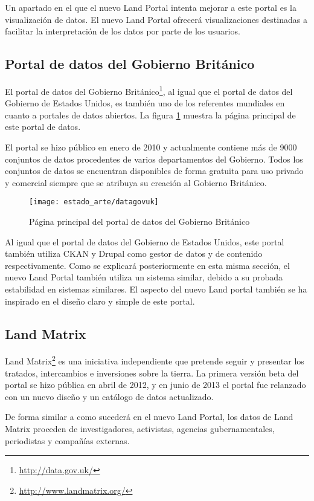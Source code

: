 {Un apartado en el que el nuevo Land Portal intenta mejorar a este portal es la visualización de datos. El nuevo Land Portal ofrecerá visualizaciones destinadas a facilitar la interpretación de los datos por parte de los usuarios.

\subsection{Portal de datos del Gobierno Británico}
El portal de datos del Gobierno Británico\footnote{\url{http://data.gov.uk/}}, al igual que el portal de datos del Gobierno de Estados Unidos, es también uno de los referentes mundiales en cuanto a portales de datos abiertos.  La figura \ref{fig:estado_arte_datagovuk} muestra la página principal de este portal de datos.

El portal se hizo público en enero de 2010 y actualmente contiene más de 9000 conjuntos de datos procedentes de varios departamentos del Gobierno.  Todos los conjuntos de datos se encuentran disponibles de forma gratuita para uso privado y comercial siempre que se atribuya su creación al Gobierno Británico.
\begin{figure}[h]
\centering
\texttt{[image: estado\_arte/datagovuk]}
\caption{Página principal del portal de datos del Gobierno Británico}
\label{fig:estado_arte_datagovuk}
\end{figure}

Al igual que el portal de datos del Gobierno de Estados Unidos, este portal también utiliza CKAN y Drupal como gestor de datos y de contenido respectivamente.  Como se explicará posteriormente en esta misma sección, el nuevo Land Portal también utiliza un sistema similar, debido a su probada estabilidad en sistemas similares.  El aspecto del nuevo Land portal también se ha inspirado en el diseño claro y simple de este portal.


\subsection{Land Matrix}
	Land Matrix\footnote{\url{http://www.landmatrix.org/}} es una iniciativa independiente que pretende seguir y presentar los tratados, intercambios e inversiones sobre la tierra.  La primera versión beta del portal se hizo pública en abril de 2012, y en junio de 2013 el portal fue relanzado con un nuevo diseño y un catálogo de datos actualizado.
	
	De forma similar a como sucederá en el nuevo Land Portal, los datos de Land Matrix proceden de investigadores, activistas, agencias gubernamentales, periodistas y compañías externas.
	
}

